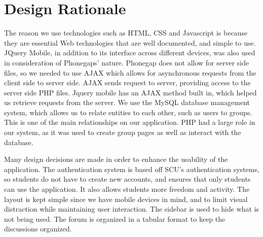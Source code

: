 \chapter{Design Rationale}
The reason we use technologies such as HTML, CSS and Javascript is because they are essential Web technologies that are well documented, and simple to use. JQuery Mobile, in addition to its interface across different devices, was also used in consideration of Phonegaps' nature. Phonegap does not allow for server side files, so we needed to use AJAX which allows for asynchronous requests from the client side to server side. AJAX sends request to server, providing access to the server side PHP files. Jquery mobile has an AJAX method  built in, which helped us retrieve requests from the server. We use the MySQL database management system, which allows us to relate entities to each other, such as users to groups. This is one of the main relationships on our application. PHP had a large role in our system, as it was used to create group pages as well as interact with the database.

Many design decisions are made in order to enhance the usability of the application. The authentication system is based off SCU’s authentication systems, so students do not have to create new accounts, and ensures that only students can use the application. It also allows students more freedom and activity. The layout is kept simple since we have mobile devices in mind, and to limit visual distraction while maintaining user interaction. The sidebar is used to hide what is not being used. The forum is organized in a tabular format to keep the discussions organized.